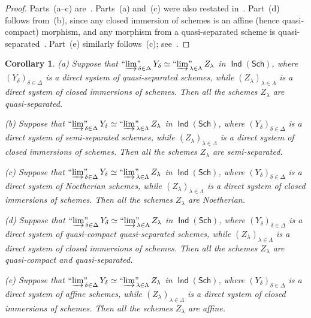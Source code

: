 \documentclass[12pt,a4paper]{amsart}
\newcommand{\+}{\protect\nobreakdash-}
\renewcommand{\:}{\colon}
\DeclareMathOperator{\Ind}{\mathsf{Ind}}
\newcommand{\Sch}{\mathsf{Sch}}
\newcommand{\ilim}
 {\mathop{\text{\normalfont``$\varinjlim$''\!\!}}\nolimits}
\theoremstyle{plain}
\newtheorem{cor}[thm]{Corollary}
\theoremstyle{definition}
\begin{document}
\begin{proof}
 Parts~(a\+-c) are~\cite[Definition Tag~01IO and Lemma Tag~07RK]{SP}.
 Parts~(a) and~(c) were also restated
in~\cite[Lemma~1.2(a\+-b)]{Psemten}.
 Part~(d) follows from~(b), since any closed immersion of schemes
is an affine (hence quasi-compact) morphism, and any morphism from
a quasi-separated scheme is quasi-separated~\cite[Lemma Tag~01KV]{SP}.
 Part~(e) similarly follows~(c); see~\cite[Lemma~1.2(c)]{Psemten}.
\end{proof}

\begin{cor} \label{Ind-of-Sch-strict-qs-qc-ss-lemma}
\textup{(a)} Suppose that\/ $\ilim_{\delta\in\Delta}Y_\delta\simeq
\ilim_{\lambda\in\Lambda}Z_\lambda$ in\/ $\Ind(\Sch)$, where
$(Y_\delta)_{\delta\in\Delta}$ is a direct system of quasi-separated
schemes, while $(Z_\lambda)_{\lambda\in\Lambda}$ is a direct system
of closed immersions of schemes.
 Then all the schemes $Z_\lambda$ are quasi-separated. \par
\textup{(b)} Suppose that\/ $\ilim_{\delta\in\Delta}Y_\delta\simeq
\ilim_{\lambda\in\Lambda}Z_\lambda$ in\/ $\Ind(\Sch)$, where
$(Y_\delta)_{\delta\in\Delta}$ is a direct system of semi-separated
schemes, while $(Z_\lambda)_{\lambda\in\Lambda}$ is a direct system
of closed immersions of schemes.
 Then all the schemes $Z_\lambda$ are semi-separated. \par
\textup{(c)} Suppose that\/ $\ilim_{\delta\in\Delta}Y_\delta\simeq
\ilim_{\lambda\in\Lambda}Z_\lambda$ in\/ $\Ind(\Sch)$, where
$(Y_\delta)_{\delta\in\Delta}$ is a direct system of Noetherian
schemes, while $(Z_\lambda)_{\lambda\in\Lambda}$ is a direct system
of closed immersions of schemes.
 Then all the schemes $Z_\lambda$ are Noetherian. \par
\textup{(d)} Suppose that\/ $\ilim_{\delta\in\Delta}Y_\delta\simeq
\ilim_{\lambda\in\Lambda}Z_\lambda$ in\/ $\Ind(\Sch)$, where
$(Y_\delta)_{\delta\in\Delta}$ is a direct system of quasi-compact
quasi-separated schemes, while $(Z_\lambda)_{\lambda\in\Lambda}$ is
a direct system of closed immersions of schemes.
 Then all the schemes $Z_\lambda$ are quasi-compact and
quasi-separated. \par
\textup{(e)} Suppose that\/ $\ilim_{\delta\in\Delta}Y_\delta\simeq
\ilim_{\lambda\in\Lambda}Z_\lambda$ in\/ $\Ind(\Sch)$, where
$(Y_\delta)_{\delta\in\Delta}$ is a direct system of affine schemes,
while $(Z_\lambda)_{\lambda\in\Lambda}$ is a direct system of closed
immersions of schemes.
 Then all the schemes $Z_\lambda$ are affine. \par
\end{cor}
\end{document}
